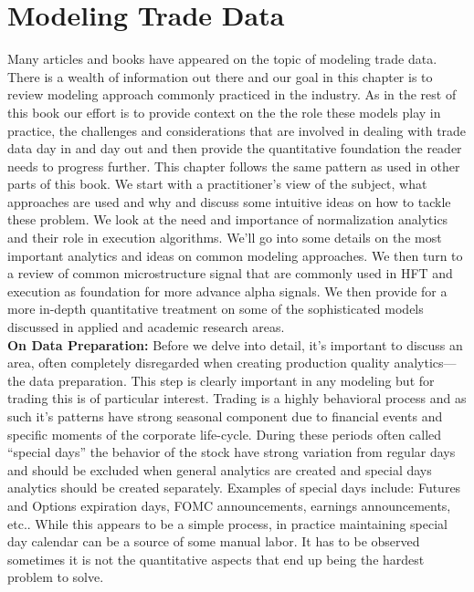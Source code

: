 \chapter{Modeling Trade Data}\label{chap:ch_trade_data_models}

Many articles and books have appeared on the topic of modeling trade data. There is a wealth of information out there and our goal in this chapter is to review modeling approach commonly practiced in the industry. As in the rest of this book our effort is to provide context on the the role these models play in practice, the challenges and considerations that are involved in dealing with trade data day in and day out and then provide the quantitative foundation the reader needs to progress further. This chapter follows the same pattern as used in other parts of this book. We start with a practitioner's view of the subject, what approaches are used  and why and discuss some intuitive ideas on how to tackle these problem. We look at the need and importance of normalization analytics and their role in execution algorithms. We'll go into some details on the most important analytics and ideas on common modeling approaches. We then turn to a review of common microstructure signal that are commonly used in HFT and execution as foundation for more advance alpha signals. We then provide for a more in-depth quantitative treatment on some of the sophisticated models discussed in applied and academic research areas. \\


\noindent\textbf{On Data Preparation:} Before we delve into detail, it's important to discuss an area, often completely disregarded when creating production quality analytics---the data preparation. This step is clearly important in any modeling but for trading this is of particular interest. Trading is a highly behavioral process and as such it's patterns have strong seasonal component due to financial events and specific moments of the corporate life-cycle. During these periods often called ``special days'' the behavior of the stock have strong variation from regular days and should be excluded when general analytics are created and special days analytics should be created separately. Examples of special days include: Futures and Options expiration days, FOMC announcements, earnings announcements, etc.. While this appears to be a simple process, in practice maintaining special day calendar can be a source of some manual labor. It has to be observed sometimes it is not the quantitative aspects that end up being the hardest problem to solve.



